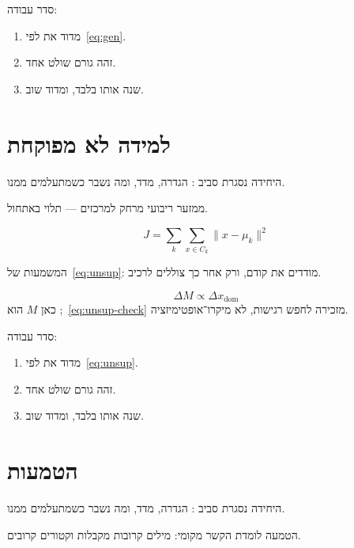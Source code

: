 סדר עבודה:
\begin{enumerate}
\item[(\textbf{א})] מדוד את  לפי~\eqref{eq:gen}.
\item[(\textbf{ב})] זהה גורם שולט אחד.
\item[(\textbf{ג})] שנה אותו בלבד, ומדוד שוב.
\end{enumerate}

\chapter{למידה לא מפוקחת}
\label{ch:unsup}

היחידה נסגרת סביב : הגדרה, מדד, ומה נשבר כשמתעלמים ממנו.

\begin{keybox}[frametitle={רעיון מפתח — למידה לא מפוקחת}]
 ממזער ריבועי מרחק למרכזים — תלוי באתחול.
\end{keybox}

\begin{equation}
\label{eq:unsup}
J=\sum_k\sum_{x\in C_k}\|x-\mu_k\|^2
\end{equation}

המשמעות של~\eqref{eq:unsup}: מודדים את  קודם, ורק אחר כך צוללים לרכיב.

\begin{equation}
\label{eq:unsup-check}
\Delta M \propto \Delta x_{\mathrm{dom}}
\end{equation}
כאן $M$ הוא ;~\eqref{eq:unsup-check} מזכירה לחפש רגישות, לא מיקרו־אופטימיזציה.

סדר עבודה:
\begin{enumerate}
\item[(\textbf{א})] מדוד את  לפי~\eqref{eq:unsup}.
\item[(\textbf{ב})] זהה גורם שולט אחד.
\item[(\textbf{ג})] שנה אותו בלבד, ומדוד שוב.
\end{enumerate}

\chapter{הטמעות}
\label{ch:embed}

היחידה נסגרת סביב : הגדרה, מדד, ומה נשבר כשמתעלמים ממנו.

\begin{defbox}[frametitle={הגדרה — הטמעות}]
הטמעה לומדת הקשר מקומי: מילים קרובות מקבלות וקטורים קרובים.
\end{defbox}

